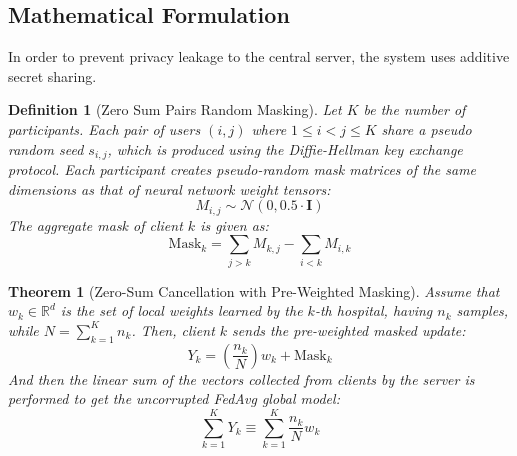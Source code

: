 \documentclass[12pt,a4paper]{report}
\newtheorem{definition}{Definition}
\newtheorem{theorem}{Theorem}
\begin{document}
\subsection{Mathematical Formulation}
In order to prevent privacy leakage to the central server, the system uses additive secret sharing.
\begin{definition}[Zero Sum Pairs Random Masking] 
Let $K$ be the number of participants. Each pair of users $(i,j)$ where $1\leq i<j\leq K$ share a pseudo random seed $s_{i,j}$, which is produced using the Diffie-Hellman key exchange protocol. Each participant creates pseudo-random mask matrices of the same dimensions as that of neural network weight tensors:
\begin{equation}
    M_{i,j} \sim \mathcal{N}(0, 0.5 \cdot \mathbf{I})
\end{equation}
The aggregate mask of client $k$ is given as:
\begin{equation}
    \text{Mask}_k = \sum_{j > k} M_{k,j} - \sum_{i < k} M_{i,k}
\end{equation}
\end{definition}

\begin{theorem}[Zero-Sum Cancellation with Pre-Weighted Masking]
Assume that $w_k \in \mathbb{R}^d$ is the set of local weights learned by the $k$-th hospital, having $n_k$ samples, while $N = \sum_{k=1}^K n_k$. Then, client $k$ sends the pre-weighted masked update:
\begin{equation}
    Y_k = \left( \frac{n_k}{N} \right) w_k + \text{Mask}_k
\end{equation}
And then the linear sum of the vectors collected from clients by the server is performed to get the uncorrupted FedAvg global model:
\begin{equation}
    \sum_{k=1}^K Y_k \equiv \sum_{k=1}^K \frac{n_k}{N} w_k
\end{equation}
\end{theorem}
\end{document}
